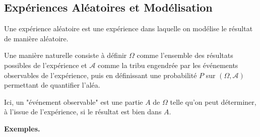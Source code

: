 \documentclass[12pt]{article}
\newcommand{\petitespace}{\vspace{0.5cm}}
\newcommand{\1}{\bb{1}} %
\begin{document}
\subsection{Expériences Aléatoires et Modélisation}



\petitespace


 Une expérience aléatoire est une expérience dans laquelle on modélise le résultat de manière aléatoire.
    
    Une manière naturelle consiste à définir \(\Omega\) comme l'ensemble des résultats possibles de l'expérience et \(\mathcal A\) comme la tribu engendrée par les événements observables de l'expérience, puis en définissant une probabilité \(P\) sur \((\Omega,\mathcal A)\) permettant de quantifier l'aléa.

 Ici, un "événement observable" est une partie \(A\) de \(\Omega\) telle qu'on peut déterminer, à l'issue de l'expérience, si le résultat est bien dans \(A\).
 \petitespace

\textbf{Exemples.} \petitespace
\end{document}
